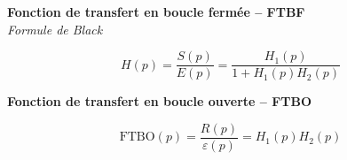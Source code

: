\begin{defi} \textbf{\textsf{Fonction de transfert en boucle fermée -- FTBF}} ~\\
\textit{Formule de Black}
\vspace{-.6cm}

\begin{minipage}[c]{.48\linewidth}
$$H(p)=\dfrac{S(p)}{E(p)}=\dfrac{H_1(p)}{1+H_1(p)H_2(p)}$$
\end{minipage}\hfill
\begin{minipage}[c]{.48\linewidth}
\begin{center}
\end{center} 
\end{minipage}
\end{defi}



\begin{defi} \textbf{\textsf{Fonction de transfert en boucle ouverte -- FTBO}}~\\

\vspace{-.6cm}

\begin{minipage}[c]{.48\linewidth}
$$\text{FTBO}(p)=\dfrac{R(p)}{\varepsilon(p)}=H_1(p) H_2(p)$$
\end{minipage}\hfill
\begin{minipage}[c]{.48\linewidth}
\begin{center}
\end{center} 
\end{minipage}

\end{defi}

